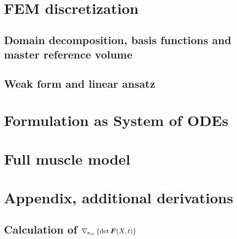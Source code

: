 \documentclass[a4paper,11pt]{article}
\begin{document}
\section{FEM discretization}
\subsection{Domain decomposition, basis functions and master reference volume}


\subsection{Weak form and linear ansatz}


\section{Formulation as System of ODEs}


\section{Full muscle model}


\newpage
\section{Appendix, additional derivations}

\subsection{Calculation of $\nabla_{\boldsymbol{c}_m}\left\{\det \boldsymbol{F}(X,t)\right\}$}




\end{document}
